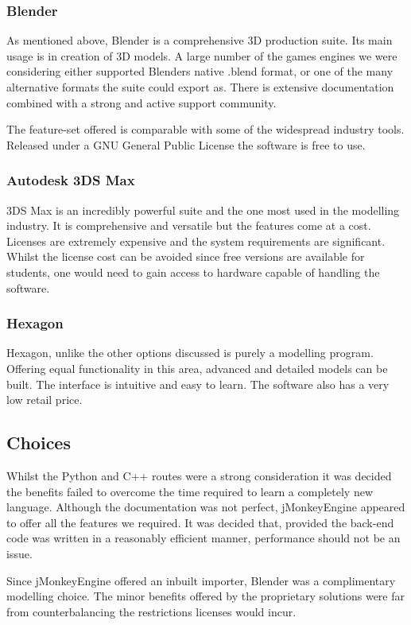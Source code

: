 \subsubsection{Blender}

As mentioned above, Blender is a comprehensive 3D production suite.
Its main usage is in creation of 3D models. A large number of the
games engines we were considering either supported Blenders native
.blend format, or one of the many alternative formats the suite could
export as. There is extensive documentation combined with a strong
and active support community.

The feature-set offered is comparable with some of the widespread industry
tools. Released under a GNU General Public License the software is
free to use.


\subsubsection{Autodesk 3DS Max}

3DS Max is an incredibly powerful suite and the one most used in the
modelling industry. It is comprehensive and versatile but the features come
at a cost. Licenses are extremely expensive and the system requirements
are significant. Whilst the license cost can be avoided since free
versions are available for students, one would need to gain access
to hardware capable of handling the software.

\subsubsection{Hexagon}

Hexagon, unlike the other options discussed is purely a modelling program.
Offering equal functionality in this area, advanced and detailed models
can be built. The interface is intuitive and easy to learn. The software
also has a very low retail price.

\subsection{Choices}

Whilst the Python and C++ routes were a strong consideration it was
decided the benefits failed to overcome the time required to learn
a completely new language. Although the documentation was not perfect,
jMonkeyEngine appeared to offer all the features we required. It was decided
that, provided the back-end code was written in a reasonably efficient
manner, performance should not be an issue.

Since jMonkeyEngine offered an inbuilt importer, Blender was a complimentary
modelling choice. The minor benefits offered by the proprietary solutions
were far from counterbalancing the restrictions licenses would incur.


